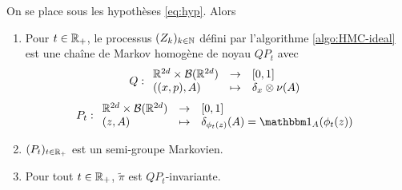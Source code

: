 \documentclass[10pt,a4paper]{article}
\begin{document}
\begin{Prop}
	On se place sous les hypothèses \eqref{eq:hyp}. Alors

	\begin{enumerate}
		\item Pour $t \in \mathbb{R}_+$, le processus $(Z_k)_{k \in \mathbb{N}}$ défini par l'algorithme \ref{algo:HMC-ideal} est une chaîne de Markov homogène de noyau $QP_t$ avec
		$$
		Q : { \begin{array}{lcl} 
		\mathbb{R}^{2d} \times \mathcal{B}(\mathbb{R}^{2d}) & \to & [0,1] \\
		((x,p), A) & \mapsto & \delta_x \otimes \nu(A)
		 \end{array} }
		$$
		$$
		P_t : \fundef{
		\rset^{2d} \times \calB(\rset^{2d}) & \to & [0,1] \\
		(z, A) & \mapsto & \delta_{\phi_t(z)}(A) = \ind_A(\phi_t(z))
		}
		$$
		\item $(P_t)_{t \in \mathbb{R}_+}$ est un semi-groupe Markovien.
		\item Pour tout $t \in \mathbb{R}_+$, $\widetilde{\pi}$ est $QP_t$-invariante. 
	\end{enumerate}
\end{Prop}
\end{document}
